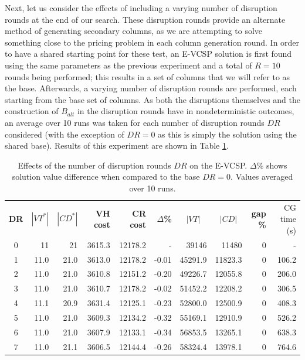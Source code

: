 \documentclass[]{article}
\begin{document}
\noindent Next, let us consider the effects of including a varying number of disruption rounds at the end of our search. These disruption rounds provide an alternate method of generating secondary columns, as we are attempting to solve something close to the pricing problem in each column generation round. In order to have a shared starting point for these test, an E-VCSP solution is first found using the same parameters as the previous experiment and a total of $R=10$ rounds being performed; this results in a set of columns that we will refer to as the base. Afterwards, a varying number of disruption rounds are performed, each starting from the base set of columns. As both the disruptions themselves and the construction of $B_{alt}$ in the disruption rounds have in nondeterministic outcomes, an average over 10 runs was taken for each number of disruption rounds $DR$ considered (with the exception of $DR=0$ as this is simply the solution using the shared base). Results of this experiment are shown in Table \ref{tab:evcsp-disruptions}.
\begin{table}[h]
  \centering
  \begin{tabular}{crrrrrrrrr}
    \toprule
       \textbf{DR} & $|VT^*|$ & $|CD^*|$ & \textbf{VH cost} & \textbf{CR cost} & \textbf{$\Delta$\%} & \multicolumn{1}{c}{$|VT|$} & \multicolumn{1}{c}{$|CD|$} & \textbf{gap \%} & CG time (s) \\
       \cmidrule(lr){1-1} \cmidrule(lr){2-6} \cmidrule(lr){7-8} \cmidrule(lr){9-10}
        0   & 11   & 21   & 3615.3 & 12178.2 & -    & 39146   & 11480 & 0 & -    \\
        1   & 11.0 & 21.0 & 3613.0 & 12178.2 & -0.01 & 45291.9 & 11823.3 & 0 & 106.2  \\
        2   & 11.0 & 21.0 & 3610.8 & 12151.2 & -0.20 & 49226.7 & 12055.8 & 0 & 206.0  \\
        3   & 11.0 & 21.0 & 3610.7 & 12178.2 & -0.02 & 51452.2 & 12208.2 & 0 & 306.5  \\
        4   & 11.1 & 20.9 & 3631.4 & 12125.1 & -0.23 & 52800.0 & 12500.9 & 0 & 408.3  \\
        5   & 11.0 & 21.0 & 3609.3 & 12134.2 & -0.32 & 55169.1 & 12910.9 & 0 & 526.2  \\
        6   & 11.0 & 21.0 & 3607.9 & 12133.1 & -0.34 & 56853.5 & 13265.1 & 0 & 638.3  \\
        7   & 11.0 & 21.1 & 3606.5 & 12144.4 & -0.26 & 58324.4 & 13978.1 & 0 & 764.6  \\
        \bottomrule
  \end{tabular}
  \caption{Effects of the number of disruption rounds $DR$ on the E-VCSP. $\Delta$\% shows solution value difference when compared to the base $DR=0$. Values averaged over 10 runs. }
  \label{tab:evcsp-disruptions}
\end{table}
\end{document}

